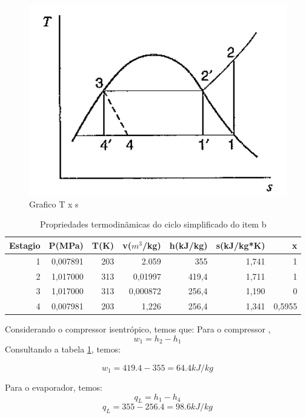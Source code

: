 \documentclass[a4paper, 12pt]{article}
\begin{document}
\begin{figure}[h]
\begin{center}
\includegraphics[scale=0.4]{./fig/3.png}
\caption{\label{fig:3}Grafico T x s} 
\end{center}
\end{figure}

\begin{table}[htbp]
  \centering
  \caption{Propriedades termodinãmicas do ciclo simplificado do item b}
    \begin{tabular}{rrrrrrr}
    \toprule
    Estagio & P(MPa) & T(K)  & v($m^{3}$/kg) & h(kJ/kg) & s(kJ/kg*K) & x \\
    \midrule
    1     & 0,007891 & 203   & 2.059 & 355   & 1,741 & 1 \\
    2     & 1,017000 & 313   & 0,01997 & 419,4 & 1,711 & 1 \\
    3     & 1,017000 & 313   & 0,000872 & 256,4 & 1,190 & 0 \\
    4     & 0,007981 & 203   & 1,226 & 256,4 & 1,341 & 0,5955 \\
    \bottomrule
    \end{tabular}%
  \label{tab:2}%
\end{table}%

Considerando o compressor isentrópico, temos que:
Para o compressor ,
\[w_{1} = h_{2} - h_{1}\]
Consultando a tabela \ref{tab:2}, temos:

\[w_{1} = 419.4 - 355 = 64.4 kJ/kg\]

Para o evaporador, temos:
\[q_{L} = h_{1} - h_{4}\]
\[q_{L} = 355 - 256.4 = 98.6 kJ/kg\]
\end{document}
